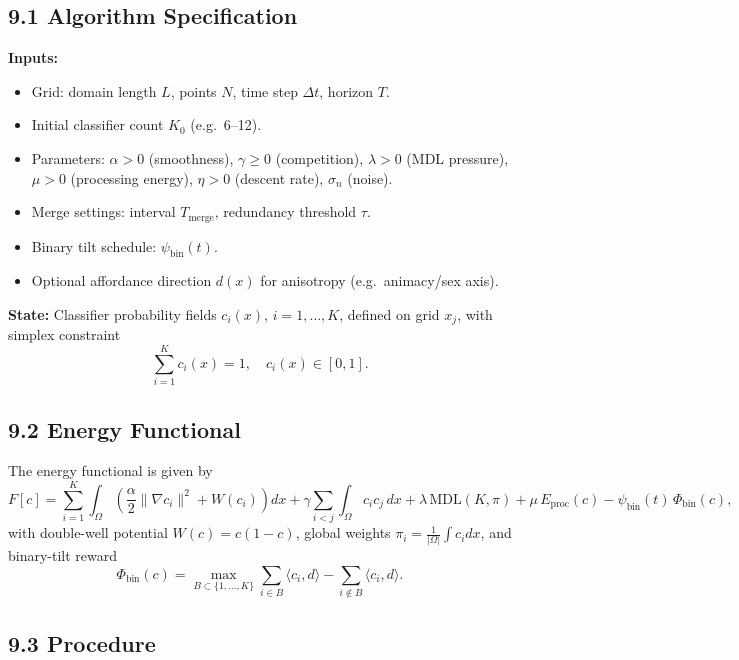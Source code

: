 \documentclass[11pt]{article}
\theoremstyle{plain}
\begin{document}
\subsection*{9.1 Algorithm Specification}

\textbf{Inputs:}
\begin{itemize}[noitemsep]
    \item Grid: domain length $L$, points $N$, time step $\Delta t$, horizon $T$.
    \item Initial classifier count $K_0$ (e.g.\ 6--12).
    \item Parameters: $\alpha>0$ (smoothness), $\gamma\ge 0$ (competition), $\lambda>0$ (MDL pressure), $\mu>0$ (processing energy), $\eta>0$ (descent rate), $\sigma_n$ (noise).
    \item Merge settings: interval $T_{\text{merge}}$, redundancy threshold $\tau$.
    \item Binary tilt schedule: $\psi_{\text{bin}}(t)$.
    \item Optional affordance direction $d(x)$ for anisotropy (e.g.\ animacy/sex axis).
\end{itemize}

\textbf{State:}
Classifier probability fields $c_i(x)$, $i=1,\dots,K$, defined on grid $x_j$, with simplex constraint
\[
\sum_{i=1}^K c_i(x) = 1, \quad c_i(x) \in [0,1].
\]

\subsection*{9.2 Energy Functional}

The energy functional is given by
\[
F[c] = \sum_{i=1}^K \int_\Omega \left( \frac{\alpha}{2} \|\nabla c_i\|^2 + W(c_i) \right) dx
+ \gamma \sum_{i<j} \int_\Omega c_i c_j \, dx
+ \lambda \, \mathrm{MDL}(K,\pi)
+ \mu\, E_{\text{proc}}(c)
- \psi_{\text{bin}}(t)\, \Phi_{\text{bin}}(c),
\]
with double-well potential $W(c)=c(1-c)$, global weights $\pi_i=\frac{1}{|\Omega|}\int c_i dx$, and binary-tilt reward
\[
\Phi_{\text{bin}}(c) = \max_{B \subset \{1,\dots,K\}}
\sum_{i \in B} \langle c_i, d \rangle
- \sum_{i \notin B} \langle c_i, d \rangle.
\]

\subsection*{9.3 Procedure}
\end{document}
